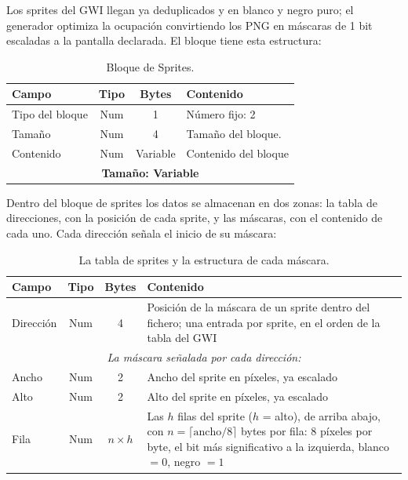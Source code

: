 Los sprites del GWI llegan ya deduplicados y en blanco y negro
puro; el generador optimiza la ocupación convirtiendo los PNG en máscaras de 1 bit escaladas a
la pantalla declarada. El bloque tiene esta estructura:

\begin{table}[htbp]
	\centering
	\begin{tabular}{|l|c|c|p{8.4cm}|}
		\hline
		\textbf{Campo} & \textbf{Tipo} & \textbf{Bytes} & \textbf{Contenido} \\
		\hline
		Tipo del bloque & Num & 1 & Número fijo: 2 \\ \hline
		Tamaño & Num & 4 & Tamaño del bloque. \\ \hline
		Contenido & Num & Variable & Contenido del bloque \\
		
		\hline\hline
		\multicolumn{4}{c}{\textbf{Tamaño: Variable}} \\ \hline
	\end{tabular}
	\caption{Bloque de Sprites.}
\end{table}

Dentro del bloque de sprites los datos se almacenan en dos zonas: la tabla de direcciones, con la posición de cada sprite, y las máscaras, con el contenido de cada uno. Cada dirección señala el inicio de su máscara:

\begin{table}[H]
	\centering
	\begin{tabular}{|l|c|c|p{8.4cm}|}
		\hline
		\textbf{Campo} & \textbf{Tipo} & \textbf{Bytes} & \textbf{Contenido} \\
		\hline
		Dirección & Num & 4 & Posición de la máscara de un sprite dentro
		del fichero; una entrada por sprite, en el orden de la tabla del
		GWI \\
		\hline
		\multicolumn{4}{|c|}{\textit{La máscara señalada por cada
				dirección:}} \\
		\hline
		Ancho & Num & 2 & Ancho del sprite en píxeles, ya escalado \\
		\hline
		Alto & Num & 2 & Alto del sprite en píxeles, ya escalado \\
		\hline
		Fila & Num & $n \times h$ & Las $h$ filas del sprite ($h$ = alto),
		de arriba abajo, con $n = \lceil \text{ancho}/8 \rceil$ bytes por
		fila: 8 píxeles por byte, el bit más significativo a la izquierda,
		blanco $= 0$, negro $= 1$ \\
		\hline
	\end{tabular}
	\caption{La tabla de sprites y la estructura de cada máscara.}
\end{table}

